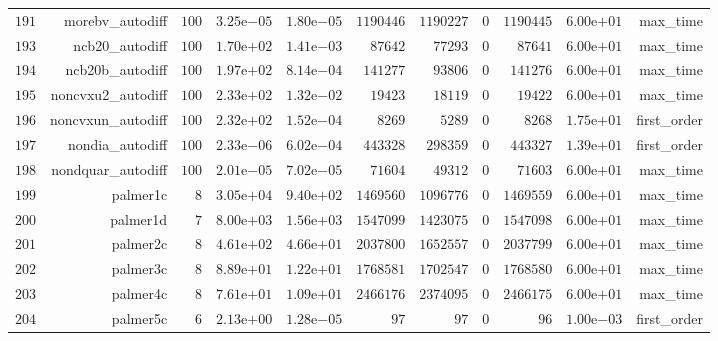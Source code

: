 \documentclass[varwidth=20cm,crop=true]{standalone}
\begin{document}
\begin{longtable}{rrrrrrrrrrr}
  \(   191\) & morebv\_autodiff & \(   100\) & \( 3.25\)e\(-05\) & \( 1.80\)e\(-05\) & \(1190446\) & \(1190227\) & \(     0\) & \(1190445\) & \( 6.00\)e\(+01\) & max\_time \\
  \(   193\) & ncb20\_autodiff & \(   100\) & \( 1.70\)e\(+02\) & \( 1.41\)e\(-03\) & \( 87642\) & \( 77293\) & \(     0\) & \( 87641\) & \( 6.00\)e\(+01\) & max\_time \\
  \(   194\) & ncb20b\_autodiff & \(   100\) & \( 1.97\)e\(+02\) & \( 8.14\)e\(-04\) & \(141277\) & \( 93806\) & \(     0\) & \(141276\) & \( 6.00\)e\(+01\) & max\_time \\
  \(   195\) & noncvxu2\_autodiff & \(   100\) & \( 2.33\)e\(+02\) & \( 1.32\)e\(-02\) & \( 19423\) & \( 18119\) & \(     0\) & \( 19422\) & \( 6.00\)e\(+01\) & max\_time \\
  \(   196\) & noncvxun\_autodiff & \(   100\) & \( 2.32\)e\(+02\) & \( 1.52\)e\(-04\) & \(  8269\) & \(  5289\) & \(     0\) & \(  8268\) & \( 1.75\)e\(+01\) & first\_order \\
  \(   197\) & nondia\_autodiff & \(   100\) & \( 2.33\)e\(-06\) & \( 6.02\)e\(-04\) & \(443328\) & \(298359\) & \(     0\) & \(443327\) & \( 1.39\)e\(+01\) & first\_order \\
  \(   198\) & nondquar\_autodiff & \(   100\) & \( 2.01\)e\(-05\) & \( 7.02\)e\(-05\) & \( 71604\) & \( 49312\) & \(     0\) & \( 71603\) & \( 6.00\)e\(+01\) & max\_time \\
  \(   199\) & palmer1c & \(     8\) & \( 3.05\)e\(+04\) & \( 9.40\)e\(+02\) & \(1469560\) & \(1096776\) & \(     0\) & \(1469559\) & \( 6.00\)e\(+01\) & max\_time \\
  \(   200\) & palmer1d & \(     7\) & \( 8.00\)e\(+03\) & \( 1.56\)e\(+03\) & \(1547099\) & \(1423075\) & \(     0\) & \(1547098\) & \( 6.00\)e\(+01\) & max\_time \\
  \(   201\) & palmer2c & \(     8\) & \( 4.61\)e\(+02\) & \( 4.66\)e\(+01\) & \(2037800\) & \(1652557\) & \(     0\) & \(2037799\) & \( 6.00\)e\(+01\) & max\_time \\
  \(   202\) & palmer3c & \(     8\) & \( 8.89\)e\(+01\) & \( 1.22\)e\(+01\) & \(1768581\) & \(1702547\) & \(     0\) & \(1768580\) & \( 6.00\)e\(+01\) & max\_time \\
  \(   203\) & palmer4c & \(     8\) & \( 7.61\)e\(+01\) & \( 1.09\)e\(+01\) & \(2466176\) & \(2374095\) & \(     0\) & \(2466175\) & \( 6.00\)e\(+01\) & max\_time \\
  \(   204\) & palmer5c & \(     6\) & \( 2.13\)e\(+00\) & \( 1.28\)e\(-05\) & \(    97\) & \(    97\) & \(     0\) & \(    96\) & \( 1.00\)e\(-03\) & first\_order \\

\end{longtable}
\end{document}
